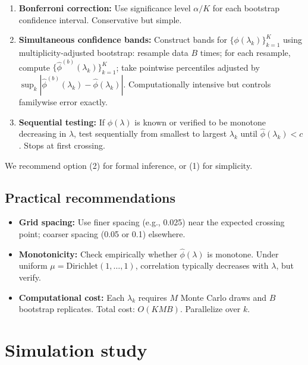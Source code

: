 \documentclass{article}
\begin{document}
\begin{enumerate}
    \item \textbf{Bonferroni correction:} Use significance level $\alpha/K$ for
          each bootstrap confidence interval. Conservative but simple.

    \item \textbf{Simultaneous confidence bands:} Construct bands for
          $\{\phi(\lambda_k)\}_{k=1}^K$ using multiplicity-adjusted bootstrap:
          resample data $B$ times; for each resample, compute $\{\hat{\phi}^{(b)}(\lambda_k)\}_{k=1}^K$;
          take pointwise percentiles adjusted by $\sup_{k} |\hat{\phi}^{(b)}(\lambda_k) - \hat{\phi}(\lambda_k)|$.
          Computationally intensive but controls familywise error exactly.

    \item \textbf{Sequential testing:} If $\phi(\lambda)$ is known or verified to be
          monotone decreasing in $\lambda$, test sequentially from smallest to largest
          $\lambda_k$ until $\hat{\phi}(\lambda_k) < c$. Stops at first crossing.
\end{enumerate}

We recommend option (2) for formal inference, or (1) for simplicity.

\subsection{Practical recommendations}

\begin{itemize}
    \item \textbf{Grid spacing:} Use finer spacing (e.g., 0.025) near the expected
          crossing point; coarser spacing (0.05 or 0.1) elsewhere.
    \item \textbf{Monotonicity:} Check empirically whether $\hat{\phi}(\lambda)$
          is monotone. Under uniform $\mu = \text{Dirichlet}(1,\ldots,1)$,
          correlation typically decreases with $\lambda$, but verify.
    \item \textbf{Computational cost:} Each $\lambda_k$ requires $M$ Monte Carlo
          draws and $B$ bootstrap replicates. Total cost: $O(KMB)$. Parallelize
          over $k$.
\end{itemize}

\section{Simulation study}
\end{document}
